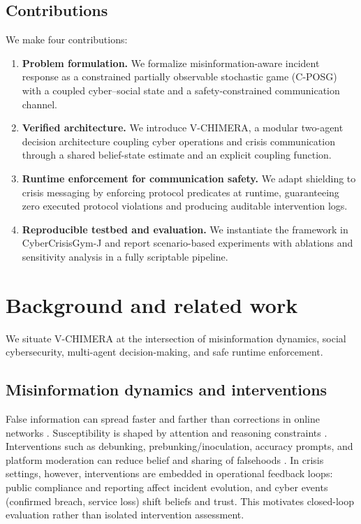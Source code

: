 \documentclass[sn-basic]{sn-jnl}
\newcommand{\model}{V-CHIMERA}
\newcommand{\envname}{CyberCrisisGym-J}
\begin{document}
\subsection{Contributions}
We make four contributions:
\begin{enumerate}[leftmargin=*]
  \item \textbf{Problem formulation.} We formalize misinformation-aware incident response as a constrained partially observable stochastic game (C-POSG) with a coupled cyber--social state and a safety-constrained communication channel.
  \item \textbf{Verified architecture.} We introduce \model{}, a modular two-agent decision architecture coupling cyber operations and crisis communication through a shared belief-state estimate and an explicit coupling function.
  \item \textbf{Runtime enforcement for communication safety.} We adapt shielding to crisis messaging by enforcing protocol predicates at runtime, guaranteeing zero executed protocol violations and producing auditable intervention logs.
  \item \textbf{Reproducible testbed and evaluation.} We instantiate the framework in \envname{} and report scenario-based experiments with ablations and sensitivity analysis in a fully scriptable pipeline.
\end{enumerate}

\section{Background and related work}
We situate \model{} at the intersection of misinformation dynamics, social cybersecurity, multi-agent decision-making, and safe runtime enforcement.

\subsection{Misinformation dynamics and interventions}
False information can spread faster and farther than corrections in online networks \citep{vosoughi2018spread,lazer2018science}. Susceptibility is shaped by attention and reasoning constraints \citep{pennycook2019lazy}. Interventions such as debunking, prebunking/inoculation, accuracy prompts, and platform moderation can reduce belief and sharing of falsehoods \citep{kozyreva2024toolbox,lewandowsky2021inoculation,ng2021platform}. In crisis settings, however, interventions are embedded in operational feedback loops: public compliance and reporting affect incident evolution, and cyber events (confirmed breach, service loss) shift beliefs and trust. This motivates closed-loop evaluation rather than isolated intervention assessment.
\end{document}

